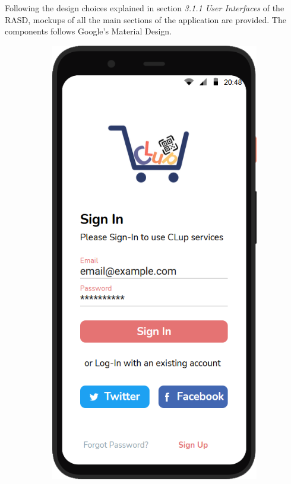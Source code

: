 Following the design choices explained in section \textit{3.1.1  User Interfaces} of the RASD, mockups of all the main sections of the application are provided. The components follows Google's Material Design.

\begin{figure}[H]
    \begin{subfigure}{.33\textwidth}
        \centering
        \includegraphics[width=.95\linewidth]{Images/screen_01.png}

\end{subfigure}
\end{figure}

